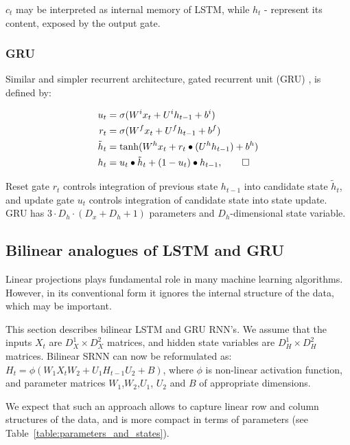 \documentclass[a4paper,11pt]{article}
\begin{document}
$c_{t}$ may be interpreted as internal memory of LSTM, while $h_{t}$ - represent its content, 
exposed by the output gate.

\subsubsection{GRU}
Similar and simpler recurrent architecture, gated recurrent unit (GRU) \cite{Chung}, is defined by:

\begin{align}
\begin{split}
\label{LSTM}
u_{t} &=\sigma(W^{i}x_{t} + U^{i}h_{t-1} + b^{i})\\
r_{t} &=\sigma(W^{f}x_{t} + U^{f}h_{t-1} + b^{f})\\
\tilde{h}_{t} &= \tanh(W^{h}x_{t} + r_{t} \bullet (U^{h}h_{t-1}) + b^{h})\\
h_{t} &= u_{t} \bullet \tilde{h}_{t} + (1 - u_{t}) \bullet h_{t-1}, \qedhere
\end{split}
\end{align}

\noindent Reset gate $r_{t}$ controls integration of previous state $h_{t-1}$ into candidate state $\tilde{h}_{t}$, and update gate $u_{t}$ controls integration of candidate state into state update. GRU has $ 3 \cdot D_{h} \cdot (D_{x}  + D_{h} + 1) $ parameters and $D_{h}$-dimensional state variable.




\subsection{Bilinear analogues of LSTM and GRU}

Linear projections plays fundamental role in many machine learning algorithms. However, in its conventional form it ignores the internal structure of the data, which may be important.

This section describes bilinear LSTM and GRU RNN's. We assume that the inputs $X_{t}$ are $D_{X}^{1} \times D_{X}^{2}$ matrices, and hidden state variables are $D_{H}^{1} \times D_{H}^{2}$ matrices. Bilinear SRNN can now be reformulated as:
$H_{t} = \phi(W_{1}X_{t}W_{2} + U_{1}H_{t-1}U_{2} + B)$, where $\phi$ is non-linear activation function, and parameter matrices $W_{1}$,$W_{2}$,$U_{1}$, $U_{2}$ and $B$ of appropriate dimensions.

We expect that such an approach allows to capture linear row and column structures of the data, and is more compact in terms of parameters (see Table~\ref{table:parameters_and_states}).
\end{document}
